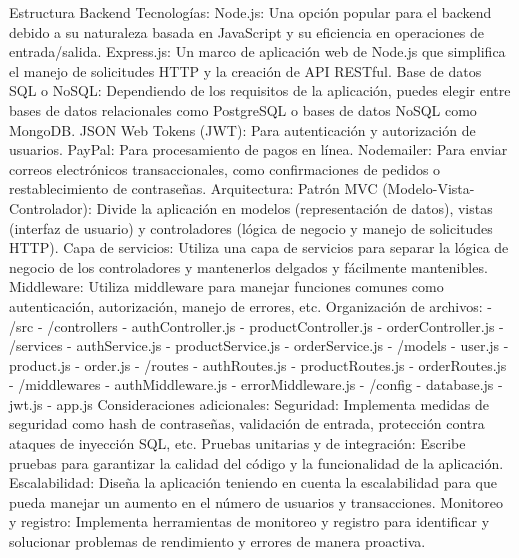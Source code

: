 Estructura Backend
Tecnologías:
Node.js: Una opción popular para el backend debido a su naturaleza basada en JavaScript y su eficiencia en operaciones de entrada/salida.
Express.js: Un marco de aplicación web de Node.js que simplifica el manejo de solicitudes HTTP y la creación de API RESTful.
Base de datos SQL o NoSQL: Dependiendo de los requisitos de la aplicación, puedes elegir entre bases de datos relacionales como PostgreSQL o bases de datos NoSQL como MongoDB.
JSON Web Tokens (JWT): Para autenticación y autorización de usuarios.
PayPal: Para procesamiento de pagos en línea.
Nodemailer: Para enviar correos electrónicos transaccionales, como confirmaciones de pedidos o restablecimiento de contraseñas.
Arquitectura:
Patrón MVC (Modelo-Vista-Controlador): Divide la aplicación en modelos (representación de datos), vistas (interfaz de usuario) y controladores (lógica de negocio y manejo de solicitudes HTTP).
Capa de servicios: Utiliza una capa de servicios para separar la lógica de negocio de los controladores y mantenerlos delgados y fácilmente mantenibles.
Middleware: Utiliza middleware para manejar funciones comunes como autenticación, autorización, manejo de errores, etc.
Organización de archivos:
- /src
  - /controllers
    - authController.js
    - productController.js
    - orderController.js
  - /services
    - authService.js
    - productService.js
    - orderService.js
  - /models
    - user.js
    - product.js
    - order.js
  - /routes
    - authRoutes.js
    - productRoutes.js
    - orderRoutes.js
  - /middlewares
    - authMiddleware.js
    - errorMiddleware.js
  - /config
    - database.js
    - jwt.js
  - app.js
Consideraciones adicionales:
Seguridad: Implementa medidas de seguridad como hash de contraseñas, validación de entrada, protección contra ataques de inyección SQL, etc.
Pruebas unitarias y de integración: Escribe pruebas para garantizar la calidad del código y la funcionalidad de la aplicación.
Escalabilidad: Diseña la aplicación teniendo en cuenta la escalabilidad para que pueda manejar un aumento en el número de usuarios y transacciones.
Monitoreo y registro: Implementa herramientas de monitoreo y registro para identificar y solucionar problemas de rendimiento y errores de manera proactiva.
